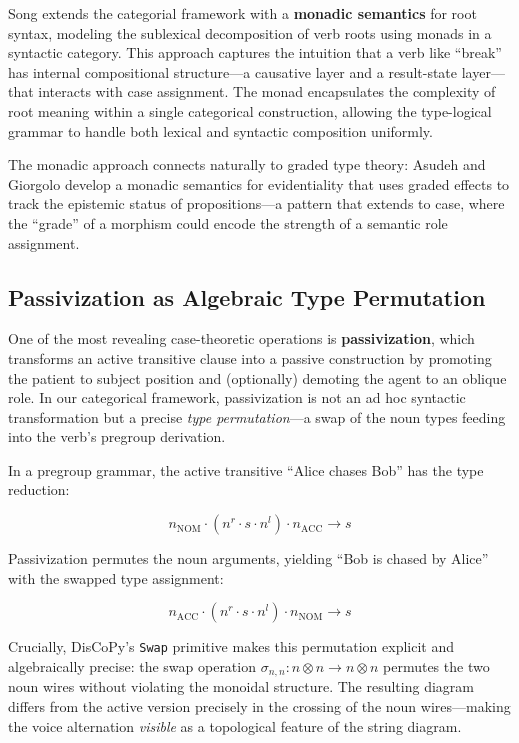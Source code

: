 \documentclass[
]{article}
\numberwithin{equation}{section}
\begin{document}
Song \citetext{\citeyear{song2022act}; \citeyear{song2022blog}} extends
the categorial framework with a \textbf{monadic semantics} for root
syntax, modeling the sublexical decomposition of verb roots using monads
in a syntactic category. This approach captures the intuition that a
verb like ``break'' has internal compositional structure---a causative
layer and a result-state layer---that interacts with case assignment.
The monad encapsulates the complexity of root meaning within a single
categorical construction, allowing the type-logical grammar to handle
both lexical and syntactic composition uniformly.

The monadic approach connects naturally to graded type theory: Asudeh
and Giorgolo \citeyearpar{asudeh2020graded} develop a monadic semantics
for evidentiality that uses graded effects to track the epistemic status
of propositions---a pattern that extends to case, where the ``grade'' of
a morphism could encode the strength of a semantic role assignment.

\subsection{Passivization as Algebraic Type
Permutation}\label{passivization-as-algebraic-type-permutation}

One of the most revealing case-theoretic operations is
\textbf{passivization}, which transforms an active transitive clause
into a passive construction by promoting the patient to subject position
and (optionally) demoting the agent to an oblique role. In our
categorical framework, passivization is not an ad hoc syntactic
transformation but a precise \emph{type permutation}---a swap of the
noun types feeding into the verb's pregroup derivation.

In a pregroup grammar, the active transitive ``Alice chases Bob'' has
the type reduction:

\[n_{\text{NOM}} \cdot (n^r \cdot s \cdot n^l) \cdot n_{\text{ACC}} \to s \tag{3.3}\]

Passivization permutes the noun arguments, yielding ``Bob is chased by
Alice'' with the swapped type assignment:

\[n_{\text{ACC}} \cdot (n^r \cdot s \cdot n^l) \cdot n_{\text{NOM}} \to s \tag{3.4}\]

Crucially, DisCoPy's \texttt{Swap} primitive makes this permutation
explicit and algebraically precise: the swap operation
\(\sigma_{n,n}: n \otimes n \to n \otimes n\) permutes the two noun
wires without violating the monoidal structure. The resulting diagram
differs from the active version precisely in the crossing of the noun
wires---making the voice alternation \emph{visible} as a topological
feature of the string diagram.
\end{document}
